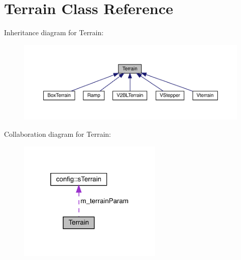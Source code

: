\hypertarget{class_terrain}{}\section{Terrain Class Reference}
\label{class_terrain}


Inheritance diagram for Terrain\+:\nopagebreak
\begin{figure}[H]
\begin{center}
\leavevmode
\includegraphics[width=350pt]{class_terrain__inherit__graph}
\end{center}
\end{figure}


Collaboration diagram for Terrain\+:\nopagebreak
\begin{figure}[H]
\begin{center}
\leavevmode
\includegraphics[width=196pt]{class_terrain__coll__graph}
\end{center}
\end{figure}

